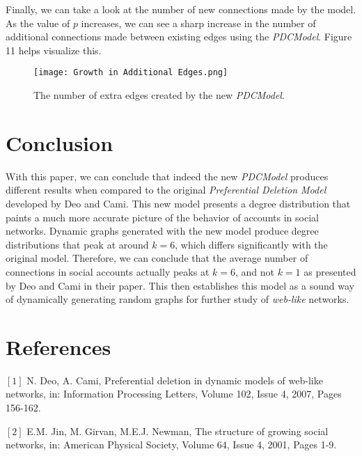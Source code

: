 \documentclass[final,3p,times,twocolumn]{elsarticle}
\begin{document}
Finally, we can take a look at the number of new connections made by the model. As the value of $p$ increases, we can see a sharp increase in the number of additional connections made between existing edges using the \textit{PDCModel}. Figure 11 helps visualize this.

\begin{figure}[h]
\centering\texttt{[image: Growth in Additional Edges.png]}
\caption{The number of extra edges created by the new \textit{PDCModel}.}

\end{figure}

\section{Conclusion}
\label{S:8}

With this paper, we can conclude that indeed the new \textit{PDCModel} produces different results when compared to the original \textit{Preferential Deletion Model} developed by Deo and Cami. This new model presents a degree distribution that paints a much more accurate picture of the behavior of accounts in social networks. Dynamic graphs generated with the new model produce degree distributions that peak at around $k = 6$, which differs significantly with the original model. Therefore, we can conclude that the average number of connections in social accounts actually peaks at $k = 6$, and not $k = 1$ as presented by Deo and Cami in their paper. This then establishes this model as a sound way of dynamically generating random graphs for further study of \textit{web-like} networks.

\section{References}
\label{S:9}

$[1]$ N. Deo, A. Cami, Preferential deletion in dynamic models of web-like networks, in: Information Processing Letters, Volume 102, Issue 4, 2007, Pages 156-162.

$[2]$ E.M. Jin, M. Girvan, M.E.J. Newman, The structure of growing social networks, in: American Physical Society, Volume 64, Issue 4, 2001, Pages 1-9.
\end{document}
